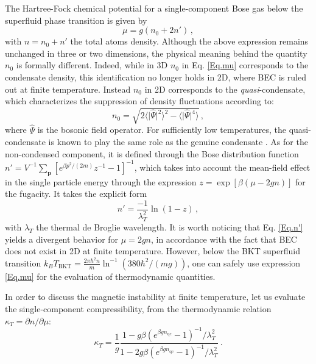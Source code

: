 \documentclass[pra,twocolumn,aps,showpacs,longbibliography]{revtex4-1}
\begin{document}
The Hartree-Fock chemical potential for a single-component Bose gas below the superfluid phase transition is given by \cite{pitaevskii_16}
\begin{equation}\label{Eq.mu}
\mu = g (n_0 + 2 n')  \, ,
\end{equation}
with $n=n_0+n'$ the total atoms density. Although the above expression remains unchanged in three or two dimensions, the physical meaning behind the quantity $n_0$ is formally different. Indeed, while in 3D $n_0$ in Eq. \eqref{Eq.mu} corresponds to the condensate density, this identification no longer holds in 2D, where BEC is ruled out at finite temperature. Instead $n_0$ in 2D corresponds to the \textit{quasi}-condensate, which characterizes the suppression of density fluctuations according to:
\begin{equation}\label{Eq:def_qc}
n_0 = \sqrt{2 \langle \vert \hat{\Psi} \vert^2 \rangle^2 - \langle \vert \hat{\Psi} \vert^4 \rangle } \, ,
\end{equation}
where $\hat{\Psi}$ is the bosonic field operator. For sufficiently low temperatures, the quasi-condensate is known to play the same role as the genuine condensate \cite{Kagan1987}. As for the non-condensed component, it is defined through the Bose distribution function $n'=V^{-1} \sum_\mathbf{p} [e^{\beta p^2/(2m)}z^{-1}-1]^{-1}$, which takes into account the mean-field effect in the single particle energy through the expression $z=\exp[\beta (\mu - 2gn)]$ for the fugacity. It takes the explicit form
\begin{equation}\label{Eq.n'}
n' = \frac{-1}{\lambda_T^{2}} \ln \left( 1-z \right) \, ,
\end{equation}
with $\lambda_T$ the thermal de Broglie wavelength. It is worth noticing that Eq. \eqref{Eq.n'} yields a divergent behavior for $\mu =2gn$, in accordance with the fact that BEC does not exist in 2D at finite temperature. However, below the BKT superfluid transition $k_B T_\mathrm{BKT}=\frac{2\pi\hbar^2n}{m} \ln^{-1}(380 \hbar^2/(mg))$, one can safely use expression \eqref{Eq.mu} for the evaluation of thermodynamic quantities. 
\par
In order to discuss the magnetic instability at finite temperature, let us evaluate the single-component compressibility, from the thermodynamic relation $\kappa_T = \partial n / \partial \mu$:
\begin{equation}\label{Eq.kappaT}
\kappa_T = \frac{1}{g} \frac{1-g \beta \left(e^{\beta gn_\mathrm{qc}}-1 \right)^{-1}/\lambda_T^2}{1-2 g \beta \left(e^{\beta gn_\mathrm{qc}}-1 \right)^{-1}/\lambda_T^2} \ .
\end{equation}%
\end{document}
